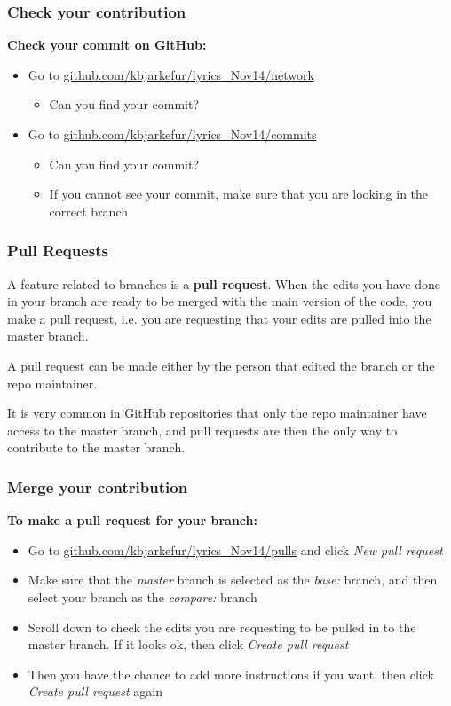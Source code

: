 \documentclass[aspectratio=169]{beamer} %
\newcommand{\trainingURL}[1]{{\color{blue}\url{#1}}}
\newcommand{\traininerUsername}{kbjarkefur}
\newcommand{\repoName}{\traininerUsername/lyrics\_Nov14}
\newcommand{\trainingRepoURL}[1]{\trainingURL{github.com/\repoName #1}}
\begin{document}
\begin{frame}
\frametitle{Check your contribution}

	\textbf{Check your commit on GitHub:}
	\begin{itemize}
		\item Go to \trainingRepoURL{/network}
		\begin{itemize}
			\item Can you find your commit?
		\end{itemize}
		\item Go to \trainingRepoURL{/commits}
		\begin{itemize}
			\item Can you find your commit?
			\item If you cannot see your commit, make sure that you are looking in the correct branch
		\end{itemize}
	\end{itemize}

\end{frame}

\begin{frame}
\frametitle{Pull Requests}

	A feature related to branches is a \textbf{pull request}. When the edits you have done in your branch are ready to be merged with the main version of the code, you make a pull request, i.e. you are requesting that your edits are pulled into the master branch.
	
	
	A pull request can be made either by the person that edited the branch or the repo maintainer. 
	
	It is very common in GitHub repositories that only the repo maintainer have access to the master branch, and pull requests are then the only way to contribute to the master branch.  


\end{frame}

\begin{frame}
\frametitle{Merge your contribution}

	\textbf{To make a pull request for your branch:}
	\begin{itemize}
		\item Go to \trainingRepoURL{/pulls} and click \textit{New pull request}
		\item Make sure that the \textit{master} branch is selected as the \textit{base:} branch, and then select your branch as the \textit{compare:} branch
		\item Scroll down to check the edits you are requesting to be pulled in to the master branch. If it looks ok, then click \textit{Create pull request}
		\item Then you have the chance to add more instructions if you want, then click \textit{Create pull request} again 
	\end{itemize}
\end{frame}
\end{document}
